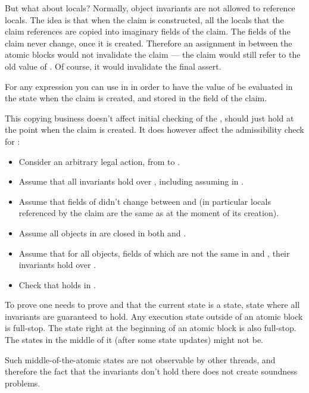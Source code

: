 But what about locals?
Normally, object invariants are not allowed to reference locals.
The idea is that when the claim is constructed, all the locals that the
claim references are copied into imaginary fields of the claim.
The fields of the claim never change, once it is created.
Therefore an assignment  in between the atomic
blocks would not invalidate the claim --- the claim would still
refer to the old value of .
Of course, it would invalidate the final  assert.

\begin{note}
For any expression  you can use  in 
in order to have the value of  be evaluated in the state
when the claim is created, and stored in the field of the claim.
\end{note}

This copying business doesn't affect initial checking of the ,
 should just hold at the point when the claim is created.
It does however affect the admissibility check for :
\begin{itemize}
\item Consider an arbitrary legal action, from  to .
\item Assume that all invariants hold over , including assuming  in .
\item Assume that fields of  didn't change between  and 
(in particular locals referenced by the claim are the same as at the moment of its creation).
\item Assume all objects in  are closed in both  and .
\item Assume that for all objects, fields of which are not the same in  and ,
their invariants hold over .
\item Check that  holds in .
\end{itemize}

To prove  one needs to prove  and that
the current state is a  state, \ie state where all invariants
are guaranteed to hold.
Any execution state outside of an atomic block is full-stop.
The state right at the beginning of an atomic block is also full-stop.
The states in the middle of it (\ie after some state updates) might not be.

\begin{note}
Such middle-of-the-atomic states are not observable by other threads, and therefore
the fact that the invariants don't hold there does not create soundness problems.
\end{note}


